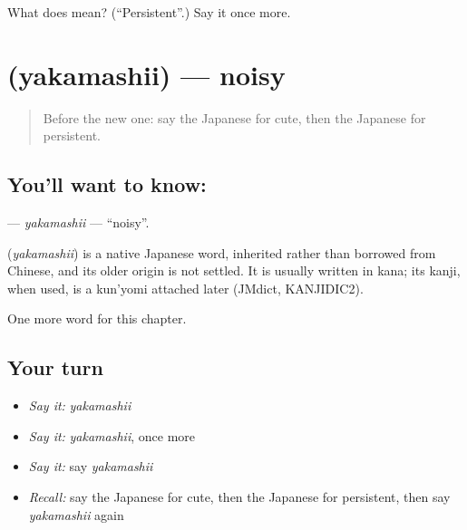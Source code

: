 \begin{tcolorbox}[breakable,colback=teal!4,colframe=teal!35!black,title={Before you move on}]
What does  mean? (\textquotedblleft{}Persistent\textquotedblright{}.) Say it once more.
\end{tcolorbox}
\section[\texorpdfstring{\ja{やかましい} (yakamashii)}{やかましい (yakamashii)}]{ (yakamashii) — noisy}

\label{lesson:JA-C129-yakamashii}



\begin{quote}
Before the new one: say the Japanese for cute, then the Japanese for persistent.
\end{quote}

\subsection*{You'll want to know: }
\textbf{} — \emph{yakamashii} — \textquotedblleft{}noisy\textquotedblright{}.

\begin{cousinweb}
\textbf{} (\emph{yakamashii}) is a native Japanese word, inherited rather than borrowed from Chinese, and its older origin is not settled. It is usually written in kana; its kanji, when used, is a kun'yomi attached later (JMdict, KANJIDIC2).
\end{cousinweb}

\begin{grammarlens}[title={What you've built}]
One more word for this chapter.
\end{grammarlens}

\subsection*{Your turn}
\begin{itemize}
\raggedright
  \item \emph{Say it:} \emph{yakamashii}
  \item \emph{Say it:} \emph{yakamashii}, once more
  \item \emph{Say it:} say \emph{yakamashii}
  \item \emph{Recall:} say the Japanese for cute, then the Japanese for persistent, then say \emph{yakamashii} again
\end{itemize}

